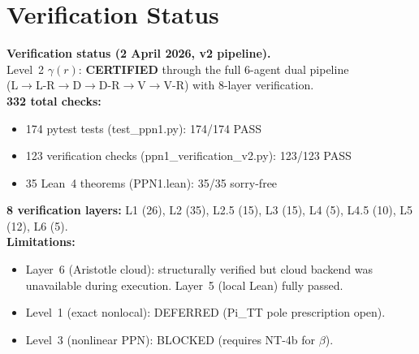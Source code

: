 \documentclass[11pt,a4paper]{article}
\begin{document}
\section{Verification Status}

\begin{center}
  \colorbox{statusgreen!10}{\parbox{0.82\textwidth}{
    \textbf{\color{statusgreen} Verification status (2 April 2026, v2 pipeline).}\\[4pt]
    Level~2 $\gamma(r)$: \textbf{CERTIFIED} through the full 6-agent dual pipeline\\
    (L$\to$L-R$\to$D$\to$D-R$\to$V$\to$V-R) with 8-layer verification.\\[4pt]
    \textbf{332 total checks:}
    \begin{itemize}[leftmargin=1.5em,topsep=2pt,itemsep=0pt]
      \item 174 pytest tests (test\_ppn1.py): 174/174 PASS
      \item 123 verification checks (ppn1\_verification\_v2.py): 123/123 PASS
      \item 35 Lean~4 theorems (PPN1.lean): 35/35 sorry-free
    \end{itemize}
    \smallskip
    \textbf{8 verification layers:}
    L1 (26), L2 (35), L2.5 (15), L3 (15), L4 (5), L4.5 (10), L5 (12), L6 (5).\\[4pt]
    \textbf{Limitations:}
    \begin{itemize}[leftmargin=1.5em,topsep=2pt,itemsep=0pt]
      \item Layer~6 (Aristotle cloud): structurally verified but cloud backend
        was unavailable during execution.  Layer~5 (local Lean) fully passed.
      \item Level~1 (exact nonlocal): DEFERRED (Pi\_TT pole prescription open).
      \item Level~3 (nonlinear PPN): BLOCKED (requires NT-4b for $\beta$).
    \end{itemize}
  }}
\end{center}
\end{document}
